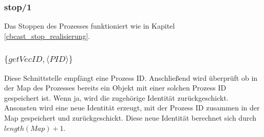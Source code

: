 \subsubsection{stop/1}

Das Stoppen des Prozesses funktioniert wie in Kapitel \ref{cbcast_stop_realisierung}.

\subsubsection{$\{getVecID,\langle PID\rangle\}$}

Diese Schnittstelle empfängt eine Prozess ID. Anschließend wird überprüft ob in der Map des Prozesses bereits ein Objekt mit einer solchen Prozess ID gespeichert ist. Wenn ja, wird die zugehörige Identität zurückgeschickt. Ansonsten wird eine neue Identität erzeugt, mit der Prozess ID zusammen in der Map gespeichert und zurückgeschickt. Diese neue Identität berechnet sich durch $length(Map) + 1$.